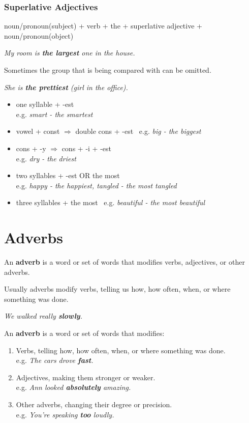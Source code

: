 \documentclass[hidelinks,10pt,a4paper]{article}
\begin{document}
\subsubsection{Superlative Adjectives}
noun/pronoun(subject) + verb + the + superlative adjective + noun/pronoun(object)
\begin{center}
	\textit{My room is \textbf{the largest} one in the house.}
\end{center}

Sometimes the group that is being compared with can be omitted.

\begin{center}
	\textit{She is \textbf{the prettiest} (girl in the office).}
\end{center}

\begin{itemize}
	\item one syllable + -est \\
		e.g. \textit{smart - the smartest}
	\item vowel + const $\Rightarrow$ double cons + -est \
		e.g. \textit{big - the biggest}
	\item cons + -y $\Rightarrow$ cons + -i + -est \\
		e.g. \textit{dry - the driest}
	\item two syllables + -est OR the most \\
		e.g. \textit{happy - the happiest, tangled - the most tangled}
	\item three syllables + the most \
		e.g. \textit{beautiful - the most beautiful}
\end{itemize}


\section{Adverbs}
An \textbf{adverb} is a word or set of words that modifies verbs, adjectives, or other adverbs.

Usually adverbs modify verbs, telling us how, how often, when, or where something was done.

\begin{center}
	\textit{We walked really \textbf{slowly}.}
\end{center}

An \textbf{adverb} is a word or set of words that modifies:

\begin{enumerate}[label=(\alph*)]
	\item Verbs, telling how, how often, when, or where something was done. \\
		e.g. \textit{The cars drove \textbf{fast}.}
	\item Adjectives, making them stronger or weaker. \\
		e.g. \textit{Ann looked \textbf{absolutely} amazing.}
	\item Other adverbs, changing their degree or precision. \\
		e.g. \textit{You're speaking \textbf{too} loudly.}
\end{enumerate}
\end{document}
